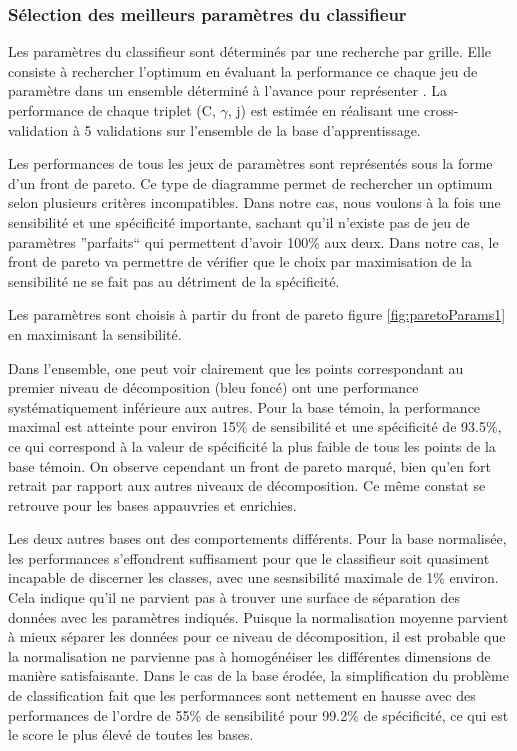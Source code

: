 \subsubsection{Sélection des meilleurs paramètres du classifieur}

Les paramètres du classifieur sont déterminés par une recherche par grille. Elle consiste à rechercher l'optimum en évaluant la performance ce chaque jeu de paramètre dans un ensemble déterminé à l'avance pour représenter . La performance de chaque triplet (C, $\gamma$, j) est estimée en réalisant une cross-validation à 5 validations sur l'ensemble de la base d'apprentissage.

Les performances de tous les jeux de paramètres sont représentés sous la forme d'un front de pareto. Ce type de diagramme permet de rechercher un optimum selon plusieurs critères incompatibles. Dans notre cas, nous voulons à la fois une sensibilité et une spécificité importante, sachant qu'il n'existe pas de jeu de paramètres ''parfaits`` qui permettent d'avoir 100\% aux deux. Dans notre cas, le front de pareto va permettre de vérifier que le choix par maximisation de la sensibilité ne se fait pas au détriment de la spécificité.

Les paramètres sont choisis à partir du front de pareto figure \ref{fig:paretoParams1} en maximisant la sensibilité.

Dans l'ensemble, one peut voir clairement que les points correspondant au premier niveau de décomposition (bleu foncé) ont une performance systématiquement inférieure aux autres. Pour la base témoin, la performance maximal est atteinte pour environ 15\% de sensibilité et une spécificité de 93.5\%, ce qui correspond à la valeur de spécificité la plus faible de tous les points de la base témoin. On observe cependant un front de pareto marqué, bien qu'en fort retrait par rapport aux autres niveaux de décomposition. Ce même constat se retrouve pour les bases appauvries et enrichies.

Les deux autres bases ont des comportements différents. Pour la base normalisée, les performances s'effondrent suffisament pour que le classifieur soit quasiment incapable de discerner les classes, avec une sesnsibilité maximale de 1\% environ. Cela indique qu'il ne parvient pas à trouver une surface de séparation des données avec les paramètres indiqués. Puisque la normalisation moyenne parvient à mieux séparer les données pour ce niveau de décomposition, il est probable que la normalisation ne parvienne pas à homogénéiser les différentes dimensions de manière satisfaisante. Dans le cas de la base érodée, la simplification du problème de classification fait que les performances sont nettement en hausse avec des performances de l'ordre de 55\% de sensibilité pour 99.2\% de spécificité, ce qui est le score le plus élevé de toutes les bases.

